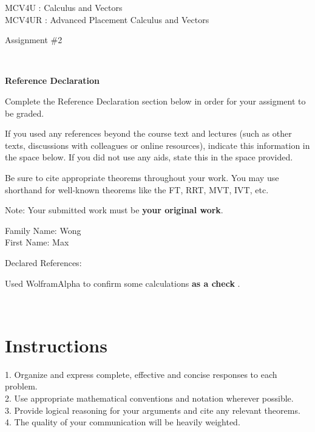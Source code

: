 \documentclass[12pt]{book}
\begin{document}
\vspace{-1.0in}\begin{center}
\Large{MCV4U : Calculus and Vectors}\\
\Large{MCV4UR : Advanced Placement Calculus and Vectors }

\Large{Assignment \#2}


\end{center}


\vspace{0.015in}\hrulefill\ 

\textbf{Reference Declaration} %

Complete the Reference Declaration section below in order for your assigment to be graded.

If you used any references beyond the course text and lectures (such as other texts, discussions with colleagues or online resources), indicate this information in the space below.  If you did not use any aids, state this in the space provided. 

Be sure to cite appropriate theorems throughout your work. You may use shorthand for well-known theorems like the FT, RRT, MVT, IVT, etc. 

Note: Your submitted work must be \textbf{your original work}. 

Family Name: Wong\\%
First Name: Max%

Declared References: 

Used WolframAlpha to confirm some calculations \textbf{ as a check }.


\vspace{0.015in}\hrulefill\ 

\newpage

\section*{Instructions}

\begin{center}
\setlength{\fboxrule}{2pt}
\begin{boxedminipage}{6.5in}
1.	Organize and express complete, effective and concise responses to each problem.\\
2.	Use appropriate mathematical conventions and notation wherever possible.\\
3.	Provide logical reasoning for your arguments and cite any relevant theorems. \\
4.  The quality of your communication will be heavily weighted.
\end{boxedminipage}
\end{center} 
\end{document}
